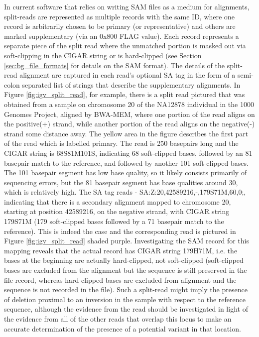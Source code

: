 In current software that relies on writing SAM files as a medium for alignments, split-reads are represented as multiple records with the same ID, where one record is arbitrarily chosen to be primary (or representative) and others are marked supplementary (via an 0x800 FLAG value). Each record represents a separate piece of the split read where the unmatched portion is masked out via soft-clipping in the CIGAR string or is hard-clipped (see Section \ref{sec:bg_file_formats} for details on the SAM format). The details of the split-read alignment are captured in each read's optional SA tag in the form of a semi-colon separated list of strings that describe the supplementary alignments. In Figure \ref{fig:igv_split_read}, for example, there is a split read pictured that was obtained from a sample on chromosome 20 of the NA12878 individual in the 1000 Genomes Project, aligned by BWA-MEM, where one portion of the read aligns on the positive(+) strand, while another portion of the read aligns on the negative(-) strand some distance away. The yellow area in the figure describes the first part of the read which is labelled primary. The read is 250 basepairs long and the CIGAR string is 68S81M101S, indicating 68 soft-clipped bases, followed by an 81 basepair match to the reference, and followed by another 101 soft-clipped bases. The 101 basepair segment has low base quality, so it likely consists primarily of sequencing errors, but the 81 basepair segment has base qualities around 30, which is relatively high. The SA tag reads - SA:Z:20,42589216,-,179S71M,60,0;, indicating that there is a secondary alignment mapped to chromosome 20, starting at position 42589216, on the negative strand, with CIGAR string 179S71M (179 soft-clipped bases followed by a 71 basepair match to the reference). This is indeed the case and the corresponding read is pictured in Figure \ref{fig:igv_split_read} shaded purple. Investigating the SAM record for this mapping reveals that the actual record has CIGAR string 179H71M, i.e. the bases at the beginning are actually hard-clipped, not soft-clipped (soft-clipped bases are excluded from the alignment but the sequence is still preserved in the file record, whereas hard-clipped bases are excluded from alignment and the sequence is not recorded in the file). Such a split-read might imply the presence of deletion proximal to an inversion in the sample with respect to the reference sequence, although the evidence from the read should be investigated in light of the evidence from all of the other reads that overlap this locus to make an accurate determination of the presence of a potential variant in that location.

